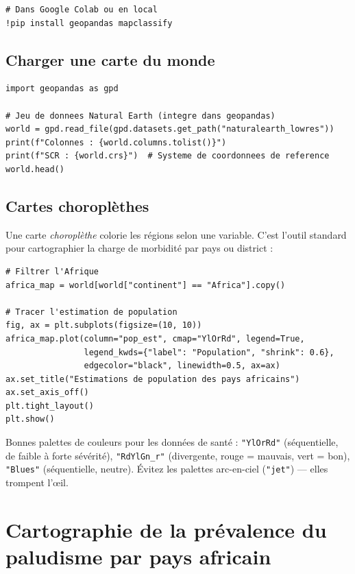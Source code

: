 \begin{verbatim}
# Dans Google Colab ou en local
!pip install geopandas mapclassify
\end{verbatim}

\subsection{Charger une carte du monde}

\begin{verbatim}
import geopandas as gpd

# Jeu de donnees Natural Earth (integre dans geopandas)
world = gpd.read_file(gpd.datasets.get_path("naturalearth_lowres"))
print(f"Colonnes : {world.columns.tolist()}")
print(f"SCR : {world.crs}")  # Systeme de coordonnees de reference
world.head()
\end{verbatim}

\subsection{Cartes choropl\`ethes}

Une carte \emph{choropl\`ethe} colorie les r\'egions selon une variable. C'est l'outil standard pour cartographier la charge de morbidité par pays ou district :

\begin{verbatim}
# Filtrer l'Afrique
africa_map = world[world["continent"] == "Africa"].copy()

# Tracer l'estimation de population
fig, ax = plt.subplots(figsize=(10, 10))
africa_map.plot(column="pop_est", cmap="YlOrRd", legend=True,
                legend_kwds={"label": "Population", "shrink": 0.6},
                edgecolor="black", linewidth=0.5, ax=ax)
ax.set_title("Estimations de population des pays africains")
ax.set_axis_off()
plt.tight_layout()
plt.show()
\end{verbatim}

\begin{pythontip}
Bonnes palettes de couleurs pour les donn\'ees de sant\'e : \texttt{"YlOrRd"} (s\'equentielle, de faible \`a forte s\'ev\'erit\'e), \texttt{"RdYlGn\_r"} (divergente, rouge = mauvais, vert = bon), \texttt{"Blues"} (s\'equentielle, neutre). \'Evitez les palettes arc-en-ciel (\texttt{"jet"}) --- elles trompent l'\oe{}il.
\end{pythontip}

\section{Cartographie de la pr\'evalence du paludisme par pays africain}

